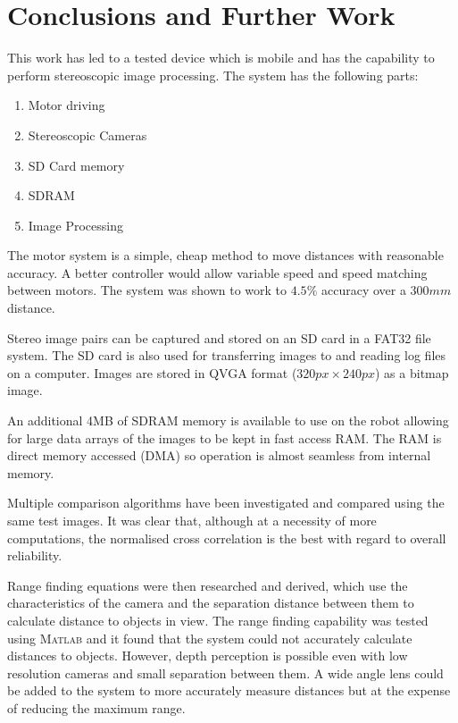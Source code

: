 \chapter{Conclusions and Further Work} \label{Chapter: Conclusions}

This work has led to a tested device which is mobile and has the capability to perform stereoscopic image processing. The system has the following parts:

\begin{enumerate}
\item Motor driving
\item Stereoscopic Cameras
\item SD Card memory
\item SDRAM
\item Image Processing
\end{enumerate} 

The motor system is a simple, cheap method to move distances with reasonable accuracy. A better controller would allow variable speed and speed matching between motors. The system was shown to work to $4.5\%$ accuracy over a $300mm$ distance.

Stereo image pairs can be captured and stored on an SD card in a FAT32 file system. The SD card is also used for transferring images to and reading log files on a computer. Images are stored in QVGA format ($320px \times 240px$) as a bitmap image. 

An additional 4MB of SDRAM memory is available to use on the robot allowing for large data arrays of the images to be kept in fast access RAM. The RAM is direct memory accessed (DMA) so operation is almost seamless from internal memory.

Multiple comparison algorithms have been investigated and compared using the same test images. It was clear that, although at a necessity of more computations, the normalised cross correlation is the best with regard to overall reliability. 

Range finding equations were then researched and derived, which use the characteristics of the camera and the separation distance between them to calculate distance to objects in view. The range finding capability was tested using \textsc{Matlab} and it found that the system could not accurately calculate distances to objects. However, depth perception is possible even with low resolution cameras and small separation between them. A wide angle lens could be added to the system to more accurately measure distances but at the expense of reducing the maximum range.

